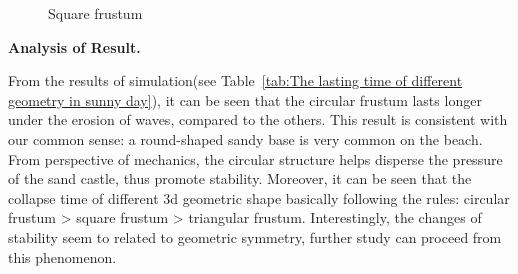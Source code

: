 \documentclass{mcmthesis}		    %
\begin{document}
     	    \begin{figure}[htbp!]
     		\centering
     		\caption{Square frustum}\label{fig:Square frustum}%
     	\end{figure}
     
    
     \textbf{Analysis of Result. }
     
     From the results of simulation(see Table~\ref{tab:The lasting time of different geometry in sunny day}), it can be seen that the circular frustum lasts longer under the erosion of waves, compared to the others. This result is consistent with our common sense: a round-shaped sandy base is very common on the beach. From perspective of mechanics, the circular structure helps disperse the pressure of the sand castle, thus promote stability.
     Moreover, it can be seen that the collapse time of different 3d geometric shape basically following the rules: circular frustum > square frustum > triangular frustum. Interestingly, the changes of stability seem to related to geometric symmetry, further study can proceed from this phenomenon. 
     
\end{document}
